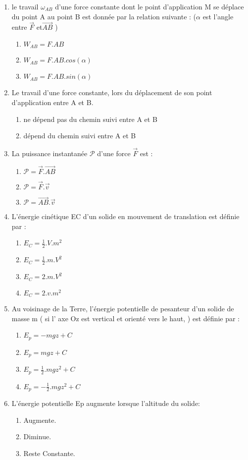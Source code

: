 \documentclass[12pt]{article}
\begin{document}
\begin{multicols}{2}
\begin{enumerate}
  \vspace{1.5cm}
\item le travail $\omega_{AB}$ d’une force constante dont le point d’application M se déplace du point A au point B est donnée
	par la relation suivante : ($\alpha$ est l’angle entre $\vec{F}$ et$\vec{AB}$ )
  \begin{enumerate}
	  \item $W_{AB} =F.AB$
	  \item $W_{AB} =F.AB.cos(\alpha)$
	  \item $W_{AB} =F.AB.sin(\alpha)$
  \end{enumerate}
\item Le travail d’une force constante, lors du déplacement de son point d’application entre A et B.
 \begin{enumerate}
	 \item  ne dépend pas du chemin suivi entre A et B
	 \item dépend du chemin suivi entre A et B
  \end{enumerate}
\item La puissance instantanée $\mathscr{P}$ d’une force $\vec{F}$ est :
 \begin{enumerate}
	 \item $\mathscr{P} = \vec{F}.\vec{AB}$
	 \item $\mathscr{P} = \vec{F}.\vec{v}$
	 \item $\mathscr{P} = \vec{AB}.\vec{v}$
  \end{enumerate}
\item L’énergie cinétique EC d’un solide en mouvement de translation est définie par :
 \begin{enumerate}
	 \item $E_C = \frac{1}{2}.V.m^2$
	 \item $E_C = \frac{1}{2}.m.V^2$
	 \item $E_C = 2.m.V^2$
	 \item $E_C = 2.v.m^2$
	   \end{enumerate}
   \item Au voisinage de la Terre, l’énergie potentielle de pesanteur d’un solide de masse m ( si l’ axe Oz est vertical et orienté vers le haut, ) est définie par :
 \begin{enumerate}
	 \item $E_p = -mgz +C$
	 \item $E_p = mgz + C$
	 \item $E_p = \frac{1}{2}.mgz^2 + C$
	 \item $E_p = -\frac{1}{2}.mgz^2 + C$
\end{enumerate}
\item L’énergie potentielle Ep augmente lorsque l’altitude du solide:
 \begin{enumerate}
	 \item Augmente.
	 \item Diminue.
	 \item Reste Constante.
\end{enumerate}



\end{enumerate}
\end{multicols}
\end{document}
